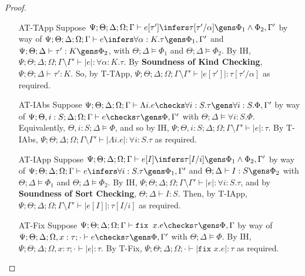 \begin{proof}
\begin{enumerate}
  \item[AT-TApp] Suppose $\Psi ; \Theta ; \Delta ; \Omega ; \Gamma \vdash e [\tau'] \infers \tau[\tau'/\alpha] \gens \Phi_1 \wedge \Phi_2, \Gamma'$ by way of $\Psi ; \Theta ; \Delta ; \Omega ; \Gamma \vdash e \infers \forall \alpha : K.\tau \gens \Phi_1, \Gamma'$ and $\Psi ; \Theta ; \Delta \vdash \tau' : K \gens \Phi_2$, with $\Theta ; \Delta \vDash \Phi_1$ and $\Theta ; \Delta \vDash \Phi_2$. By IH, $\Psi ; \Theta ; \Delta ; \Omega ; \Gamma \setminus \Gamma' \vdash |e| : \forall \alpha : K.\tau$. By \textbf{Soundness of Kind Checking}, $\Psi ; \Theta ; \Delta \vdash \tau' : K$. So, by T-TApp,  $\Psi ; \Theta ; \Delta ; \Omega ; \Gamma\setminus \Gamma' \vdash |e [\tau']| : \tau[\tau'/\alpha]$ as required.
  
  \item[AT-IAbs]
  Suppose $\Psi ; \Theta ; \Delta ; \Omega ; \Gamma \vdash \Lambda i. e \checks \forall i : S. \tau \gens \forall i : S. \Phi, \Gamma'$ by way of $\Psi ; \Theta, i : S ; \Delta ; \Omega ; \Gamma \vdash e \checks \tau \gens \Phi, \Gamma'$ with $\Theta ; \Delta \vDash \forall i : S. \Phi$. Equivalently, $\Theta , i : S; \Delta \vDash \Phi$, and so by IH, $\Psi ; \Theta, i : S ; \Delta ; \Omega ; \Gamma \setminus \Gamma' \vdash |e| : \tau$. By T-IAbs, $\Psi ; \Theta ; \Delta ; \Omega ; \Gamma\setminus \Gamma' \vdash |\Lambda i. e| : \forall i : S. \tau$ as required.
  
  \item[AT-IApp] Suppose $\Psi ; \Theta ; \Delta ; \Omega ; \Gamma \vdash e [I] \infers \tau[I/i] \gens \Phi_1 \wedge \Phi_2,\Gamma'$ by way of $\Psi ; \Theta ; \Delta ; \Omega ; \Gamma \vdash e \infers \forall i : S.\tau \gens \Phi_1,\Gamma'$ and $\Theta ; \Delta \vdash I : S \gens \Phi_2$ with $\Theta ; \Delta \vDash \Phi_1$ and $\Theta ; \Delta \vDash \Phi_2$. By IH, $\Psi ; \Theta ; \Delta ; \Omega ; \Gamma \setminus \Gamma' \vdash |e| : \forall i : S.\tau$, and by \textbf{Soundness of Sort Checking}, $\Theta ; \Delta \vdash I : S$. Then, by T-IApp, $\Psi ; \Theta ; \Delta ; \Omega ; \Gamma\setminus \Gamma' \vdash |e [I]| : \tau[I/i]$ as required.
  
  \item[AT-Fix] Suppose $\Psi ; \Theta ; \Delta ; \Omega ; \Gamma \vdash \texttt{fix } x.e \checks \tau \gens \Phi,\Gamma$ by way of $\Psi ; \Theta ; \Delta ; \Omega, x : \tau ; \cdot \vdash e \checks \tau \gens \Phi,\Gamma'$ with $\Theta ; \Delta \vDash \Phi$. By IH, $\Psi ; \Theta ; \Delta ; \Omega, x : \tau ; \cdot \vdash |e| : \tau$. By T-Fix, $\Psi ; \Theta ; \Delta ; \Omega ; \cdot \vdash |\texttt{fix } x.e| : \tau$ as required.
  

\end{enumerate}
\end{proof}
